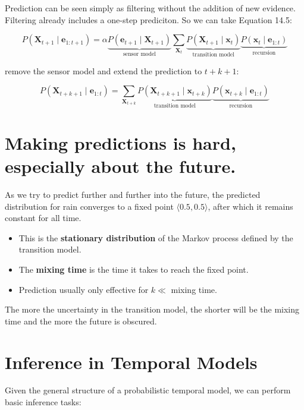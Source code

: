 \documentclass[11pt]{article}
\begin{document}
Prediction can be seen simply as filtering without the addition of new evidence.  Filtering already includes a one-step prediciton.  So we can take Equation 14.5:

\vspace{-.1in}
\[
P(\bm{X}_{t+1} \mid \bm{e}_{1:t+1}) = \alpha \underbrace{P(\bm{e}_{t+1} \mid \bm{X}_{t+1})}_{\text{sensor model}} \sum_{\bm{X}_t} \underbrace{P(\bm{X}_{t+1} \mid \bm{x}_t)}_{\text{transition model}} \underbrace{P(\bm{x}_t \mid \bm{e}_{1:t})}_{\text{recursion}} \tag{14.5}
\]

remove the sensor model and extend the prediction to \(t + k + 1\):

\vspace{-.1in}
\[
P(\bm{X}_{t+k+1} \mid \bm{e}_{1:t}) =  \sum_{\bm{X}_{t+k}} \underbrace{P(\bm{X}_{t+k+1} \mid \bm{x}_{t+k})}_{\text{transition model}} \underbrace{P(\bm{x}_{t+k} \mid \bm{e}_{1:t})}_{\text{recursion}} \tag{14.6}
\]
\section{Making predictions is hard, especially about the future.}
\label{sec:org8ef2858}

As we try to predict further and further into the future, the predicted distribution for rain converges to a fixed point \(\langle 0.5,0.5 \rangle\), after which it remains constant for all time.

\begin{itemize}
\item This is the \textbf{stationary distribution} of the Markov process defined by the transition model.

\item The \textbf{mixing time} is the time it takes to reach the fixed point.

\item Prediction usually only effective for \(k \ll\) mixing time.
\end{itemize}

The more the uncertainty in the transition model, the shorter will be the mixing time and the more the future is obscured.
\section{Inference in Temporal Models}
\label{sec:org6a1fdfd}

Given the general structure of a probabilistic temporal model, we can perform basic inference tasks:
\end{document}

